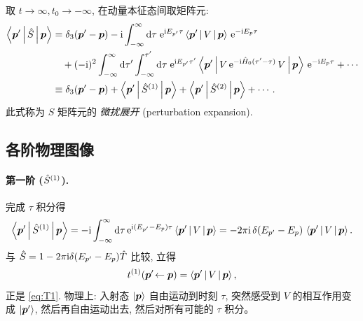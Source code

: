 取 $t\to\infty,t_{0}\to-\infty$, 在动量本征态间取矩阵元:
\begin{align}
\left\langle \bm p' \,\middle|\, \hat{S} \,\middle|\, \bm p \right\rangle
&=\delta_{3}(\bm p'-\bm p)
-\mathrm{i}\int_{-\infty}^{\infty}\mathrm{d}\tau\;\mathrm{e}^{\mathrm{i} E_{p'}\tau}\left\langle \bm p' \,\middle|\, V \,\middle|\, \bm p \right\rangle\,\mathrm{e}^{-\mathrm{i} E_{p}\tau}\notag\\
&\quad+(-\mathrm{i})^{2}\int_{-\infty}^{\infty}\mathrm{d}\tau'\int_{-\infty}^{\tau'}\mathrm{d}\tau\;
\mathrm{e}^{\mathrm{i} E_{p'}\tau'}\left\langle \bm p' \,\middle|\, V\,\mathrm{e}^{-\mathrm{i}\hat{H}_{0}(\tau'-\tau)}\,V \,\middle|\, \bm p \right\rangle\,\mathrm{e}^{-\mathrm{i} E_{p}\tau}+\cdots\notag\\
&\equiv \delta_{3}(\bm p'-\bm p)+\left\langle \bm p' \,\middle|\, \hat{S}^{(1)} \,\middle|\, \bm p \right\rangle+\left\langle \bm p' \,\middle|\, \hat{S}^{(2)} \,\middle|\, \bm p \right\rangle+\cdots .
\label{eq:S-pert}
\end{align}
此式称为 $S$ 矩阵元的 \emph{微扰展开} (perturbation expansion).

\subsection{各阶物理图像}

\paragraph{第一阶 ($\hat{S}^{(1)}$).}
完成 $\tau$ 积分得
\begin{equation}
\left\langle \bm p' \,\middle|\, \hat{S}^{(1)} \,\middle|\, \bm p \right\rangle
=-\mathrm{i}\int_{-\infty}^{\infty}\mathrm{d}\tau\,\mathrm{e}^{\mathrm{i}(E_{p'}-E_{p})\tau}\left\langle \bm p' \,\middle|\, V \,\middle|\, \bm p \right\rangle
=-2\pi\mathrm{i}\,\delta(E_{p'}-E_{p})\,\left\langle \bm p' \,\middle|\, V \,\middle|\, \bm p \right\rangle.
\end{equation}
与 $\hat{S}=1-2\pi\mathrm{i}\delta(E_{p'}-E_{p})\hat{T}$ 比较, 立得
\begin{equation}
t^{(1)}(\bm p'\!\leftarrow\bm p)=\left\langle \bm p' \,\middle|\, V \,\middle|\, \bm p \right\rangle,
\end{equation}
正是 \eqref{eq:T1}. 物理上: 入射态 $\ket{\bm p}$ 自由运动到时刻 $\tau$, 突然感受到 $V$ 的相互作用变成 $\ket{\bm p'}$, 然后再自由运动出去, 然后对所有可能的 $\tau$ 积分。


